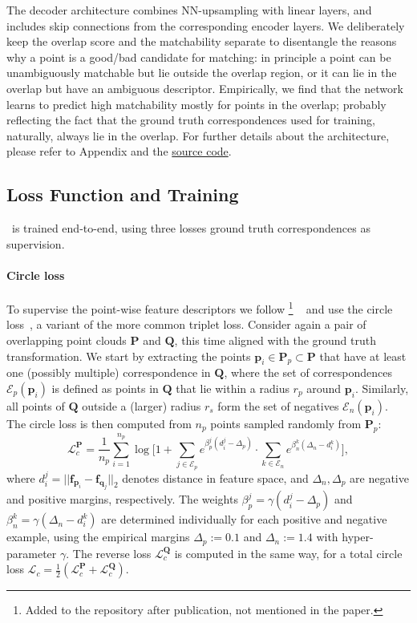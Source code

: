 The decoder architecture combines {NN}-upsampling with linear layers, and includes skip connections from the corresponding encoder layers.
We deliberately keep the overlap score and the matchability separate
to disentangle the reasons why a point is a good/bad candidate for matching: in principle a point can be unambiguously matchable but lie outside the overlap region, or it can lie in the overlap but have an ambiguous descriptor.
Empirically, we find that the network learns to predict high matchability mostly for points in the overlap; probably reflecting the fact that the ground truth correspondences used for training, naturally, always lie in the overlap.
For further details about the architecture, please refer to Appendix and the \href{https://github.com/ShengyuH/OverlapPredator}{source code}.

\subsection{Loss Function and Training}
\label{sec:method_training}
\acro\ is trained end-to-end, using three losses \wrt ground truth correspondences as supervision.

\paragraph{Circle loss}
To supervise the point-wise feature descriptors we follow%
\footnote{Added to the repository after publication, not mentioned in the paper.}%
~\cite{bai2020d3feat} and use the circle loss~\cite{sun2020circle}, a variant of the more common triplet loss.
Consider again a pair of overlapping point clouds $\mathbf{P}$ and $\mathbf{Q}$, this time aligned with the ground truth transformation. We start by extracting the points $\mathbf{p}_i\!\in\!\mathbf{P}_p\!\subset\!\mathbf{P}$ that have at least one (possibly multiple) correspondence in $\mathbf{Q}$,
where the set of correspondences $\mathcal{E}_p(\mathbf{p}_i)$  is defined as points in $\mathbf{Q}$ that lie within a radius $r_p$ around $\mathbf{p}_i$. Similarly, all points of $\mathbf{Q}$  outside a (larger) radius
$r_s$ form the set of negatives $\mathcal{E}_n(\mathbf{p}_i)$.
The circle loss is then computed from $n_p$ points sampled randomly from $\mathbf{P}_p$: %
\begin{equation}
\mathcal{L}_c^\mathbf{P} = \frac{1}{n_p}\sum\limits_{i=1}^{n_p} \log \Big [ 1 +\!\! \sum\limits_{j\in\mathcal{E}_p}\!e^{ \beta_p^j(d_i^j - \Delta_p)} \cdot\!
\sum\limits_{k\in\mathcal{E}_n} \!e^{\beta_n^k(\Delta_n - d_i^k)}\Big ],
\end{equation}
where $d_i^j=||\mathbf{f}_{\mathbf{p}_i} - \mathbf{f}_{\mathbf{q}_j} ||_2$ denotes distance in feature space, and $\Delta_n,\Delta_p$ are negative and positive margins, respectively. The weights $\beta_p^j\!=\!\gamma(d_i^j\!-\!\Delta_p)$ and $\beta_n^k\!=\!\gamma(\Delta_n\!-\!d_i^k)$ are determined individually for each positive and negative example, using the empirical margins $\Delta_p\!:=\!0.1$ and $\Delta_n\!:=\!1.4$ with hyper-parameter $\gamma$. The reverse loss  $\mathcal{L}_c^\mathbf{Q}$ is computed in the same way, for a total circle loss $\mathcal{L}_c = \frac{1}{2}(\mathcal{L}_c^\mathbf{P} + \mathcal{L}_c^\mathbf{Q})$.

